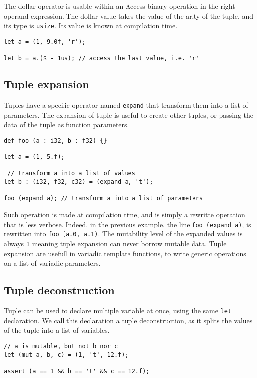 The dollar operator is usable within an Access binary operation in the right
operand expression. The dollar value takes the value of the arity of the tuple,
and its type is \texttt{usize}. Its value is known at compilation time.

\begin{lstlisting}[style=coloredverbatim]
let a = (1, 9.0f, 'r');

let b = a.($ - 1us); // access the last value, i.e. 'r'
\end{lstlisting}

\subsection {Tuple expansion}

Tuples have a specific operator named \texttt{expand} that transform them into a
list of parameters. The expansion of tuple is useful to create other tuples, or
passing the data of the tuple as function parameters.

\begin{lstlisting}[style=coloredverbatim]
def foo (a : i32, b : f32) {}

let a = (1, 5.f);

 // transform a into a list of values
let b : (i32, f32, c32) = (expand a, 't');

foo (expand a); // transform a into a list of parameters
\end{lstlisting}

Such operation is made at compilation time, and is simply a rewritte operation
that is less verbose. Indeed, in the previous example, the line \texttt{foo
  (expand a)}, is rewritten into \texttt{foo (a.0, a.1)}. The mutability level
of the expanded values is always \texttt{1} meaning tuple expansion can never
borrow mutable data. Tuple expansion are usefull in variadic template functions,
to write generic operations on a list of variadic parameters.

\subsection {Tuple deconstruction}

Tuple can be used to declare multiple variable at once, using the same
\texttt{let} declaration. We call this declaration a tuple deconstruction, as it
splits the values of the tuple into a list of variables.

\begin{lstlisting}[style=coloredverbatim]
  // a is mutable, but not b nor c
let (mut a, b, c) = (1, 't', 12.f);

assert (a == 1 && b == 't' && c == 12.f);
\end{lstlisting}

